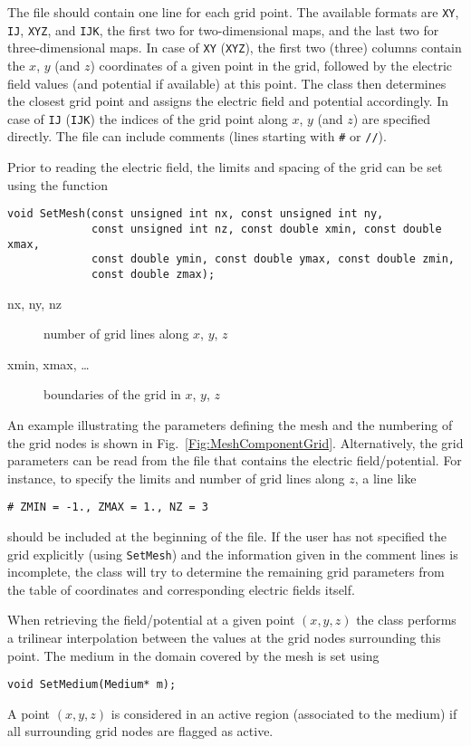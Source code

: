 The file should contain one line for each grid point.
The available formats are \texttt{XY}, \texttt{IJ}, \texttt{XYZ}, 
and \texttt{IJK}, the first two for two-dimensional maps, and the 
last two for three-dimensional maps.
In case of \texttt{XY} (\texttt{XYZ}), the first two (three) columns  
contain the $x$, $y$ (and $z$) coordinates of a given point in the 
grid, followed by the electric field values (and potential if available) at 
this point. The class then determines the closest grid point 
and assigns the electric field and potential accordingly.
In case of \texttt{IJ} (\texttt{IJK}) the indices of the grid point 
along $x$, $y$ (and $z$) are specified directly.
The file can include comments (lines starting with \texttt{\#} or \texttt{//}). 

Prior to reading the electric field, the limits and spacing of the grid 
can be set using the function
\begin{lstlisting}
void SetMesh(const unsigned int nx, const unsigned int ny,
             const unsigned int nz, const double xmin, const double xmax,
             const double ymin, const double ymax, const double zmin,
             const double zmax);
\end{lstlisting}
\begin{description}
  \item[nx, ny, nz] 
  number of grid lines along $x$, $y$, $z$
  \item[xmin, xmax, \dots] 
  boundaries of the grid in $x$, $y$, $z$
\end{description}
An example illustrating the parameters defining the mesh and the 
numbering of the grid nodes is shown in Fig.~\ref{Fig:MeshComponentGrid}.
Alternatively, the grid parameters can be read from the file that contains
the electric field/potential. For instance, to specify the 
limits and number of grid lines along $z$, a line like 
\begin{lstlisting}
# ZMIN = -1., ZMAX = 1., NZ = 3 
\end{lstlisting} 
should be included at the beginning of the file.
If the user has not specified the grid explicitly (using \texttt{SetMesh}) 
and the information given in the comment lines is incomplete, the 
class will try to determine the remaining grid parameters from the 
table of coordinates and corresponding electric fields itself.

When retrieving the field/potential at a given point $\left(x, y, z\right)$ 
the class performs a trilinear interpolation between the values at the 
grid nodes surrounding this point. The medium in the domain covered by the mesh 
is set using 
\begin{lstlisting}
void SetMedium(Medium* m);
\end{lstlisting}
A point $\left(x,y,z\right)$ is considered in an active region 
(\ie associated to the medium) if all surrounding grid nodes are 
flagged as active. 

